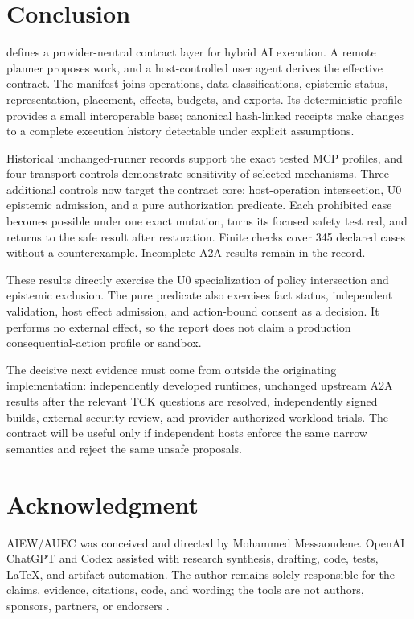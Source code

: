 \section{Conclusion}
\label{sec:conclusion}

\AUEC defines a provider-neutral contract layer for hybrid AI execution. A remote planner proposes work, and a host-controlled user agent derives the effective contract. The manifest joins operations, data classifications, epistemic status, representation, placement, effects, budgets, and exports. Its deterministic \Uzero profile provides a small interoperable base; canonical hash-linked receipts make changes to a complete execution history detectable under explicit assumptions.

Historical unchanged-runner records support the exact tested MCP profiles, and four transport controls demonstrate sensitivity of selected mechanisms. Three additional controls now target the contract core: host-operation intersection, U0 epistemic admission, and a pure authorization predicate. Each prohibited case becomes possible under one exact mutation, turns its focused safety test red, and returns to the safe result after restoration. Finite checks cover 345 declared cases without a counterexample. Incomplete A2A results remain in the record.

These results directly exercise the U0 specialization of policy intersection and epistemic exclusion. The pure predicate also exercises fact status, independent validation, host effect admission, and action-bound consent as a decision. It performs no external effect, so the report does not claim a production consequential-action profile or sandbox.

The decisive next evidence must come from outside the originating implementation: independently developed runtimes, unchanged upstream A2A results after the relevant TCK questions are resolved, independently signed builds, external security review, and provider-authorized workload trials. The contract will be useful only if independent hosts enforce the same narrow semantics and reject the same unsafe proposals.

\section*{Acknowledgment}
AIEW/AUEC was conceived and directed by Mohammed Messaoudene. OpenAI ChatGPT and Codex assisted with research synthesis, drafting, code, tests, \LaTeX{}, and artifact automation. The author remains solely responsible for the claims, evidence, citations, code, and wording; the tools are not authors, sponsors, partners, or endorsers \cite{ACMAuthorship2026}.
